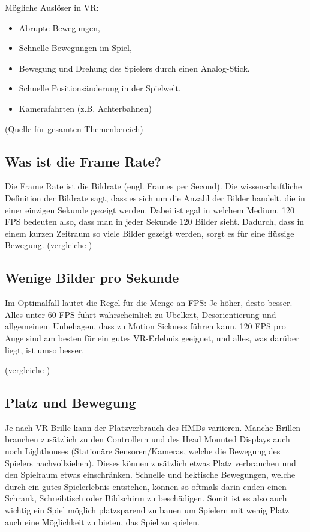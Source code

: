 \vspace{1cm}
Mögliche Auslöser in VR:
\begin{itemize}
	\item Abrupte Bewegungen,
	\item Schnelle Bewegungen im Spiel,
	\item Bewegung und Drehung des Spielers durch einen Analog-Stick.
	\item Schnelle Positionsänderung in der Spielwelt.
	\item Kamerafahrten (z.B. Achterbahnen)
\end{itemize}

(Quelle für gesamten Themenbereich)
\cite{_motionsickness}
\cite{_vr_quovadis}


\subsection{Was ist die Frame Rate?}
Die Frame Rate ist die Bildrate (engl. Frames per Second). Die wissenschaftliche Definition der Bildrate sagt, dass es sich um die Anzahl der Bilder handelt, die in einer einzigen Sekunde gezeigt werden. Dabei ist egal in welchem Medium. 120 FPS bedeuten also, dass man in jeder Sekunde 120 Bilder sieht. Dadurch, dass in einem kurzen Zeitraum so viele Bilder gezeigt werden, sorgt es für eine flüssige Bewegung.
(vergleiche \cite{_vr_linde})

\subsection{Wenige Bilder pro Sekunde}
Im Optimalfall lautet die Regel für die Menge an FPS: Je höher, desto besser. Alles unter 60 FPS führt wahrscheinlich zu Übelkeit, Desorientierung und allgemeinem Unbehagen, dass zu Motion Sickness führen kann. 120 FPS pro Auge sind am besten für ein gutes VR-Erlebnis geeignet, und alles, was darüber liegt, ist umso besser.

(vergleiche \cite{_vr_linde})

\subsection{Platz und Bewegung}
Je nach VR-Brille kann der Platzverbrauch des HMDs variieren. Manche Brillen brauchen zusätzlich zu den Controllern und des Head Mounted Displays auch noch Lighthouses (Stationäre Sensoren/Kameras, welche die Bewegung des Spielers nachvollziehen). Dieses können zusätzlich etwas Platz verbrauchen und den Spielraum etwas einschränken. Schnelle und hektische Bewegungen, welche durch ein gutes Spielerlebnis entstehen, können so oftmals darin enden einen Schrank, Schreibtisch oder Bildschirm zu beschädigen. Somit ist es also auch wichtig ein Spiel möglich platzsparend zu bauen um Spielern mit wenig Platz auch eine Möglichkeit zu bieten, das Spiel zu spielen.

